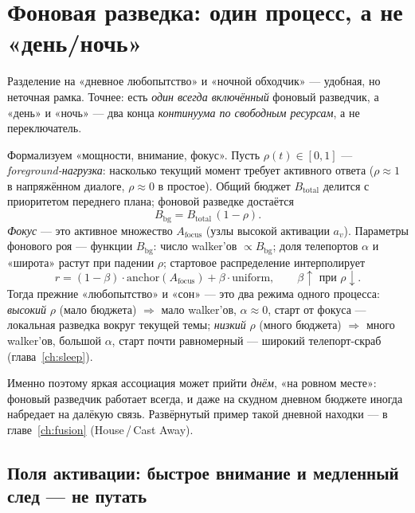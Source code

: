 \section{Фоновая разведка: один процесс, а не «день/ночь»}
\label{sec:background}

Разделение на «дневное любопытство» и «ночной обходчик» — удобная, но неточная
рамка. Точнее: есть \emph{один всегда включённый} фоновый разведчик, а «день» и
«ночь» — два конца \emph{континуума по свободным ресурсам}, а не переключатель.

Формализуем «мощности, внимание, фокус». Пусть $\rho(t)\in[0,1]$ —
\emph{foreground-нагрузка}: насколько текущий момент требует активного ответа
($\rho\approx 1$ в напряжённом диалоге, $\rho\approx 0$ в простое). Общий бюджет
$B_{\text{total}}$ делится с приоритетом переднего плана; фоновой разведке достаётся
\begin{equation}
B_{\text{bg}}=B_{\text{total}}\,(1-\rho).
\end{equation}
\emph{Фокус} — это активное множество $A_{\text{focus}}$ (узлы высокой активации
$a_v$). Параметры фонового роя — функции $B_{\text{bg}}$: число walker'ов
$\propto B_{\text{bg}}$; доля телепортов $\alpha$ и «широта» растут при падении
$\rho$; стартовое распределение интерполирует
\[
r=(1-\beta)\cdot\mathrm{anchor}(A_{\text{focus}})+\beta\cdot\mathrm{uniform},
\qquad \beta\uparrow \text{ при } \rho\downarrow.
\]
Тогда прежние «любопытство» и «сон» — это два режима одного процесса:
\emph{высокий} $\rho$ (мало бюджета) $\Rightarrow$ мало walker'ов, $\alpha\approx 0$,
старт от фокуса — локальная разведка вокруг текущей темы; \emph{низкий} $\rho$ (много
бюджета) $\Rightarrow$ много walker'ов, большой $\alpha$, старт почти равномерный —
широкий телепорт-скраб (глава~\ref{ch:sleep}).

\begin{intuition}
Именно поэтому яркая ассоциация может прийти \emph{днём}, «на ровном месте»: фоновый
разведчик работает всегда, и даже на скудном дневном бюджете иногда набредает на
далёкую связь. Развёрнутый пример такой дневной находки — в главе~\ref{ch:fusion}
(House\,/\,Cast Away).
\end{intuition}

\subsection{Поля активации: быстрое внимание и медленный след — не путать}
\label{sec:brightness}

